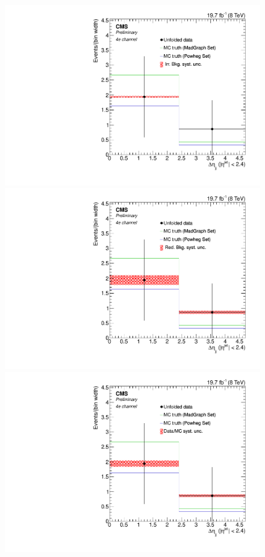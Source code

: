 \begin{figure}[hbtp]
\begin{center}
   \includegraphics[width=0.8\cmsFigWidth]{Figures/Unfolding/Systematics/ZZTo4e_CentralDeta_IrrBkg_Mad_fr}
   \includegraphics[width=0.8\cmsFigWidth]{Figures/Unfolding/Systematics/ZZTo4e_CentralDeta_RedBkg_Mad_fr}     
   \includegraphics[width=0.8\cmsFigWidth]{Figures/Unfolding/Systematics/ZZTo4e_CentralDeta_UnfDataOverGenMC_Mad_fr}     

\end{center}
\end{figure}
